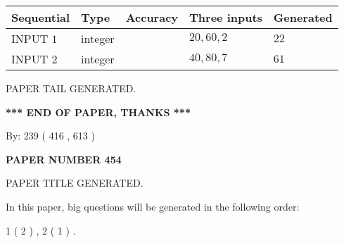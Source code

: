 \documentclass[12pt]{article}
\begin{document}
   
  
  
\noindent\begin{tabular}{|l|l|l|l|l|}
\hline
 Sequential & Type & Accuracy & Three inputs & Generated \\ 
\hline
 
 
  INPUT $  1 $ & integer &  & $
 20
 , 
 60
 , 
 2
 $ & $ 22 $ 
 \\  \hline  
 
 
  INPUT $  2 $ & integer &  & $
 40
 , 
 80
 , 
 7
 $ & $ 61 $ 
 \\  \hline  
 \end{tabular}
   
   
   
   
   
   
 \vspace{0.2in}
 
   
   
\vspace{2.0in} PAPER TAIL GENERATED.
   
   
   
   
\vspace{1.0in} 
{\textbf{\large{ *** END OF PAPER, THANKS *** }}} 
   
   
\hspace{1.0in} By: 
 239 ( 416 ,  613 )
   
   
   
   
\newpage 
\setcounter{page}{ 
   454001 } 
   
   
   
   
 {\textbf{ \Large{ PAPER NUMBER  454  }}}
   
   
\vspace{0.2in}
   
   
   
   
   
   
   
   
 \vspace{0.2in}
 
 
 
 
   
   
 PAPER TITLE GENERATED.
   
   
   
\vspace{0.2in}
   
In this paper, big questions will be generated in the following order: 
   
   
   1 ( 2 )
 ,
   2 ( 1 )
 .
  
\end{document}
